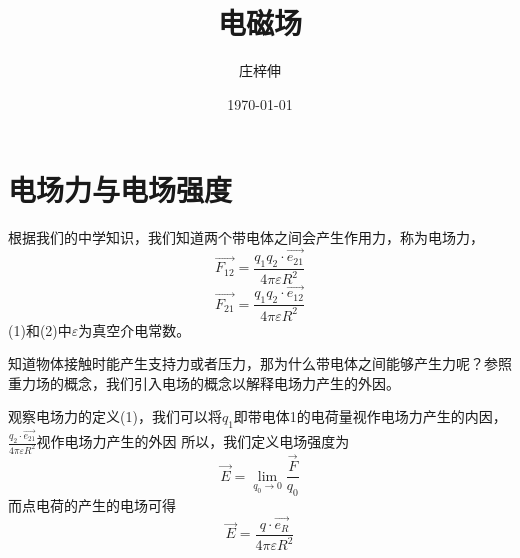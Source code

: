 \documentclass[UTF8]{article} %
\title{\heiti 电磁场}
\author{\kaishu 庄梓伸}
\date{\today}
\begin{document}
\maketitle

\section{电场力与电场强度}
根据我们的中学知识，我们知道两个带电体之间会产生作用力，称为电场力，
\begin{equation}
    \vec{F_{12}}=\frac{q_{1} q_{2} \cdot \vec{e_{21}}}{4 \pi \varepsilon R^{2}}
\end{equation}
\begin{equation}
    \vec{F_{21}}=\frac{q_{1} q_{2} \cdot \vec{e_{12}}}{4 \pi \varepsilon R^{2}}
\end{equation}
(1)和(2)中$\varepsilon$为真空介电常数。

知道物体接触时能产生支持力或者压力，那为什么带电体之间能够产生力呢？参照重力场的概念，我们引入电场的概念以解释电场力产生的外因。

观察电场力的定义(1)，我们可以将$q_{1}$即带电体1的电荷量视作电场力产生的内因，$\frac{q_{2} \cdot \vec{e_{21}}}{4 \pi \varepsilon R^{2}}$视作电场力产生的外因
所以，我们定义电场强度为
\begin{equation}
    \vec{E}=\lim_{q_{0} \to 0}\frac{\vec{F}}{q_{0}}
\end{equation}
而点电荷的产生的电场可得
\begin{equation}
    \vec{E}=\frac{q \cdot \vec{e_{R}}}{4 \pi \varepsilon R^{2}}
\end{equation}
\end{document}
